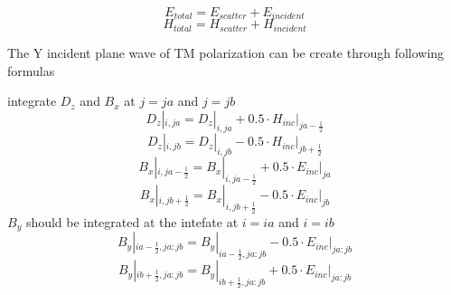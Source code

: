 \begin{displaymath}
  E_{total}=E_{scatter}+E_{incident}
\end{displaymath}
\begin{displaymath}
  H_{total}=H_{scatter}+H_{incident}  
\end{displaymath}


The Y incident plane wave of TM polarization can be create through following formulas

integrate $D_z$ and $B_x$ at $j=ja$ and $j=jb$
\begin{displaymath}
  D_z|_{i,ja} = D_z|_{i,ja} + 0.5 \cdot H_{inc}|_{ja-\frac{1}{2}}
\end{displaymath}
\begin{displaymath}
  D_z|_{i,jb} = D_z|_{i,jb} - 0.5 \cdot H_{inc}|_{jb+\frac{1}{2}}  
\end{displaymath}
\begin{displaymath}
  B_x|_{i,ja-\frac{1}{2}}=B_x|_{i,ja-\frac{1}{2}}+0.5 \cdot E_{inc}|_{ja}
\end{displaymath}
\begin{displaymath}
  B_x|_{i,jb+\frac{1}{2}}=B_x|_{i,jb+\frac{1}{2}}-0.5 \cdot E_{inc}|_{jb}
\end{displaymath}
$B_y$ should be integrated at the intefate at $i=ia$ and $i=ib$
\begin{displaymath}
  B_y|_{ia-\frac{1}{2},ja:jb}=B_y|_{ia-\frac{1}{2},ja:jb}-0.5 \cdot E_{inc}|_{ja:jb}
\end{displaymath}
\begin{displaymath}
  B_y|_{ib+\frac{1}{2},ja:jb}=B_y|_{ib+\frac{1}{2},ja:jb}+0.5 \cdot E_{inc}|_{ja:jb}
\end{displaymath}







